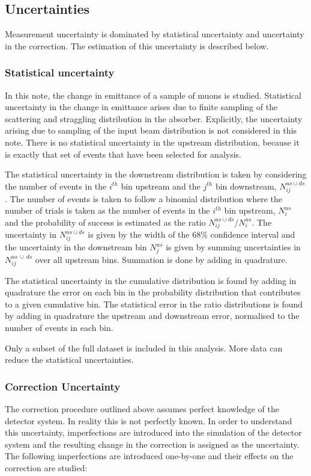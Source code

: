 \subsection{Uncertainties}

Measurement uncertainty is dominated by statistical uncertainty and uncertainty 
in the correction. The estimation of this uncertainty is described below.

\subsubsection{Statistical uncertainty}
In this note, the change in emittance of a sample of muons is studied. 
Statistical uncertainty in the change in emittance arises due to finite sampling 
of the scattering and straggling distribution in the absorber. Explicitly, the
uncertainty arising due to sampling of the input beam distribution is not
considered in this note. There is no statistical uncertainty in the upstream 
distribution, because it is exactly that set of events that have been selected
for analysis.

The statistical uncertainty in the downstream distribution is taken by 
considering the number of events in the $i^{th}$ bin upstream and the $j^{th}$ bin 
downstream,  $N^{us \cup ds}_{ij}$. The number of events is taken to follow a 
binomial distribution  where the number of trials is taken as the number of 
events in the $i^{th}$ bin upstream, $N^{us}_i$ and the probability of success is 
estimated as the ratio $N^{us \cup ds}_{ij}/N^{us}_i$. The uncertainty in 
$N^{us \cup ds}_{ij}$ is given by the width of the 
$68 \%$ confidence interval and the uncertainty in the downstream bin 
$N^{us}_{j}$ is given by summing uncertainties in $N^{us \, \cup \, ds}_{ij}$ over all 
upstream bins. Summation is done by adding in quadrature.

The statistical uncertainty in the cumulative distribution is found by adding in
quadrature the error on each bin in the probability distribution that contributes
to a given cumulative bin. The statistical error in the ratio distributions is
found by adding in quadrature the upstream and downstream error, 
normalised to the number of events in each bin.

Only a subset of the full dataset is included in this analysis. More data can
reduce the statistical uncertainties.

\subsubsection{Correction Uncertainty}
The correction procedure outlined above assumes perfect knowledge of the 
detector system. In reality this is not perfectly known. In order to understand
this uncertainty, imperfections are
introduced into the simulation of the detector system and the resulting change
in the correction is assigned as the uncertainty. The following imperfections
are introduced one-by-one and their effects on the correction are studied:

